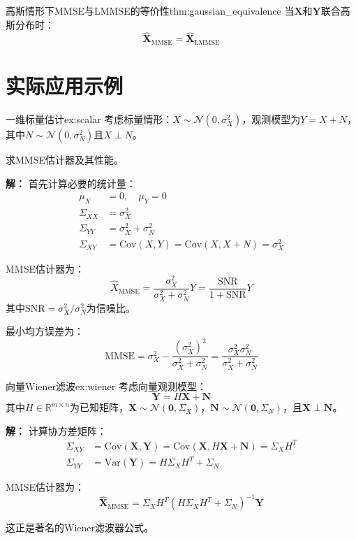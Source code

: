\documentclass[11pt]{article}
\renewcommand{\vec}[1]{\bm{#1}}
\newcommand{\Var}{\text{Var}}
\newcommand{\Cov}{\text{Cov}}
\newcommand{\normal}{\mathcal{N}}
\newcommand{\reals}{\mathbb{R}}
\begin{document}
\begin{theorem}{高斯情形下MMSE与LMMSE的等价性}{thm:gaussian_equivalence}
当$\vec{X}$和$\vec{Y}$联合高斯分布时：
\begin{equation}
\hat{\vec{X}}_{\text{MMSE}} = \hat{\vec{X}}_{\text{LMMSE}}
\end{equation}
\end{theorem}

\section{实际应用示例}

\begin{example}{一维标量估计}{ex:scalar}
考虑标量情形：$X \sim \normal(0, \sigma_X^2)$，观测模型为$Y = X + N$，其中$N \sim \normal(0, \sigma_N^2)$且$X \perp N$。

求MMSE估计器及其性能。

\textbf{解：}
首先计算必要的统计量：
\begin{align}
\mu_X &= 0, \quad \mu_Y = 0 \\
\Sigma_{XX} &= \sigma_X^2 \\
\Sigma_{YY} &= \sigma_X^2 + \sigma_N^2 \\
\Sigma_{XY} &= \Cov(X, Y) = \Cov(X, X+N) = \sigma_X^2
\end{align}

MMSE估计器为：
\begin{equation}
\hat{X}_{\text{MMSE}} = \frac{\sigma_X^2}{\sigma_X^2 + \sigma_N^2} Y = \frac{\text{SNR}}{1 + \text{SNR}} Y
\end{equation}
其中$\text{SNR} = \sigma_X^2/\sigma_N^2$为信噪比。

最小均方误差为：
\begin{equation}
\text{MMSE} = \sigma_X^2 - \frac{(\sigma_X^2)^2}{\sigma_X^2 + \sigma_N^2} = \frac{\sigma_X^2 \sigma_N^2}{\sigma_X^2 + \sigma_N^2}
\end{equation}
\end{example}

\begin{example}{向量Wiener滤波}{ex:wiener}
考虑向量观测模型：
\begin{equation}
\vec{Y} = H\vec{X} + \vec{N}
\end{equation}
其中$H \in \reals^{m \times n}$为已知矩阵，$\vec{X} \sim \normal(\vec{0}, \Sigma_X)$，$\vec{N} \sim \normal(\vec{0}, \Sigma_N)$，且$\vec{X} \perp \vec{N}$。

\textbf{解：}
计算协方差矩阵：
\begin{align}
\Sigma_{XY} &= \Cov(\vec{X}, \vec{Y}) = \Cov(\vec{X}, H\vec{X} + \vec{N}) = \Sigma_X H^T \\
\Sigma_{YY} &= \Var(\vec{Y}) = H\Sigma_X H^T + \Sigma_N
\end{align}

MMSE估计器为：
\begin{equation}
\hat{\vec{X}}_{\text{MMSE}} = \Sigma_X H^T (H\Sigma_X H^T + \Sigma_N)^{-1} \vec{Y}
\end{equation}

这正是著名的Wiener滤波器公式。
\end{example}
\end{document}

